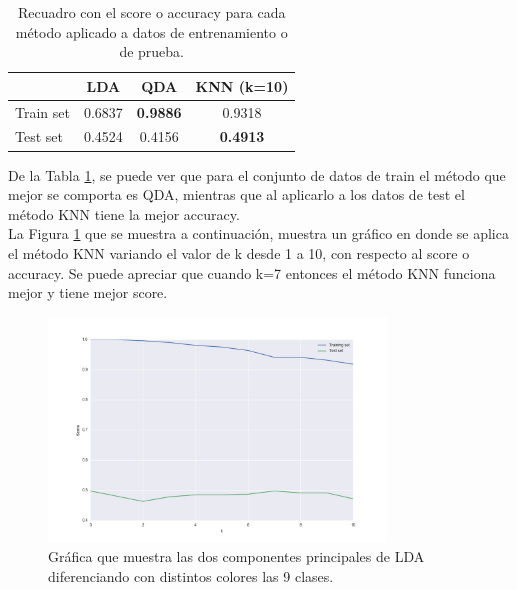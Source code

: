 \documentclass[letter, 10pt]{article}
\begin{document}
\begin{table}[!hbt] 
\begin{center}
\begin{tabular}{| l | c | c | c |} 
\hline
\textbf{} & \textbf{LDA} & \textbf{QDA} &\textbf{KNN (k=10)} \\ 
\hline 
Train set & 0.6837 & \textbf{0.9886} & 0.9318\\ 
Test set &0.4524 & 0.4156 & \textbf{0.4913}\\
\hline 
\end{tabular}
\caption{Recuadro con el score o accuracy para cada método aplicado a datos de entrenamiento o de prueba.} 
\label{table:score}
\end{center} 
\end{table}

De la Tabla \ref{table:score}, se puede ver que para el conjunto de datos de train el método que mejor se comporta es QDA, mientras que al aplicarlo a los datos de test el método KNN tiene la mejor accuracy.\\

La Figura \ref{G1.3} que se muestra a continuación, muestra un gráfico en donde se aplica el método KNN variando el valor de k desde 1 a 10, con respecto al score o accuracy. Se puede apreciar que cuando k=7 entonces el método KNN funciona mejor y tiene mejor score.\\

\begin{figure}[h]
\begin{center}
\includegraphics[width=0.8\textwidth]{Images/figure_3.png}
\caption{Gráfica que muestra las dos componentes principales de LDA diferenciando con distintos colores las 9 clases.}
\label{G1.3}
\end{center}
\end{figure}
\end{document}
